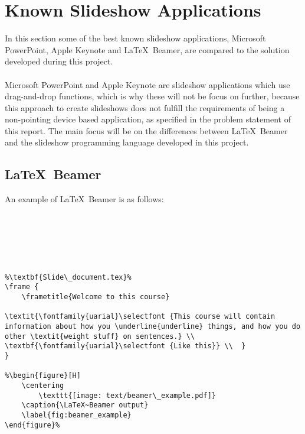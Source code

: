 \chapter{Known Slideshow Applications}
In this section some of the best known slideshow applications, Microsoft PowerPoint, Apple Keynote and \LaTeX~Beamer, are compared to the solution developed during this project.
\\ \\
Microsoft PowerPoint and Apple Keynote are slideshow applications which use drag-and-drop functions, which is why these will not be focus on further, because this approach to create slideshows does not fulfill the requirements of being a non-pointing device based application, as specified in the problem statement of this report. The main focus will be on the differences between \LaTeX~Beamer and the slideshow programming language developed in this project.

\section{\LaTeX~Beamer}
An example of \LaTeX~Beamer is as follows:

\begin{lstlisting}[frame=single, caption={Beamer example}, label=lst_beamer]
%\textbf{Main\_document.tex}%






%\textbf{Slide\_document.tex}%
\frame {
	\frametitle{Welcome to this course}

\textit{\fontfamily{uarial}\selectfont {This course will contain information about how you \underline{underline} things, and how you do other \textit{weight stuff} on sentences.} \\
\textbf{\fontfamily{uarial}\selectfont {Like this}} \\	}
}

%\begin{figure}[H]
	\centering
		\texttt{[image: text/beamer\_example.pdf]}
	\caption{\LaTeX~Beamer output}
	\label{fig:beamer_example}
\end{figure}%

\end{lstlisting}

